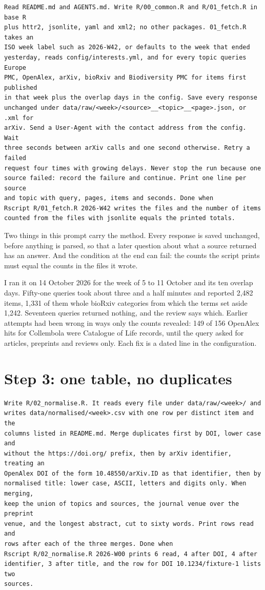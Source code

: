 \begin{lstlisting}[caption={The first prompt}]
Read README.md and AGENTS.md. Write R/00_common.R and R/01_fetch.R in base R
plus httr2, jsonlite, yaml and xml2; no other packages. 01_fetch.R takes an
ISO week label such as 2026-W42, or defaults to the week that ended
yesterday, reads config/interests.yml, and for every topic queries Europe
PMC, OpenAlex, arXiv, bioRxiv and Biodiversity PMC for items first published
in that week plus the overlap days in the config. Save every response
unchanged under data/raw/<week>/<source>__<topic>__<page>.json, or .xml for
arXiv. Send a User-Agent with the contact address from the config. Wait
three seconds between arXiv calls and one second otherwise. Retry a failed
request four times with growing delays. Never stop the run because one
source failed: record the failure and continue. Print one line per source
and topic with query, pages, items and seconds. Done when
Rscript R/01_fetch.R 2026-W42 writes the files and the number of items
counted from the files with jsonlite equals the printed totals.
\end{lstlisting}

Two things in this prompt carry the method. Every response is saved
unchanged, before anything is parsed, so that a later question about what a
source returned has an answer. And the condition at the end can fail: the
counts the script prints must equal the counts in the files it wrote.

I ran it on 14 October 2026 for the week of 5 to 11 October and its ten
overlap days. Fifty-one queries took about three and a half minutes and
reported 2,482 items, 1,331 of them whole bioRxiv categories from which the
terms set aside 1,242. Seventeen queries returned nothing, and the review says
which. Earlier attempts had been wrong in ways only the counts revealed: 149
of 156 OpenAlex hits for Collembola were Catalogue of Life records, until the
query asked for articles, preprints and reviews only. Each fix is a dated
line in the configuration.

\section{Step 3: one table, no duplicates}

\begin{lstlisting}[caption={The second prompt}]
Write R/02_normalise.R. It reads every file under data/raw/<week>/ and
writes data/normalised/<week>.csv with one row per distinct item and the
columns listed in README.md. Merge duplicates first by DOI, lower case and
without the https://doi.org/ prefix, then by arXiv identifier, treating an
OpenAlex DOI of the form 10.48550/arXiv.ID as that identifier, then by
normalised title: lower case, ASCII, letters and digits only. When merging,
keep the union of topics and sources, the journal venue over the preprint
venue, and the longest abstract, cut to sixty words. Print rows read and
rows after each of the three merges. Done when
Rscript R/02_normalise.R 2026-W00 prints 6 read, 4 after DOI, 4 after
identifier, 3 after title, and the row for DOI 10.1234/fixture-1 lists two
sources.
\end{lstlisting}

